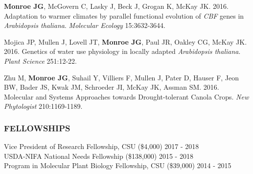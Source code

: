 \documentclass[12pt,english]{article}
\begin{document}
\begin{hangparas}{.5in}{1}
\vspace{1ex}\par
\hspace{1em} \textbf{Monroe JG}, McGovern C, Lasky J, Beck J, Grogan K, McKay JK. 2016. Adaptation to warmer climates by parallel functional evolution of \textit{CBF} genes in \textit{Arabidopsis thaliana}. \textit{Molecular Ecology} 15:3632-3644.
\vspace{1ex}\par
\hspace{1em} Mojica JP, Mullen J, Lovell JT, \textbf{Monroe JG}, Paul JR, Oakley CG, McKay JK. 2016. Genetics of water use physiology in locally adapted \textit{Arabidopsis thaliana}. \textit{Plant Science}  251:12-22.
\vspace{1ex}\par
\hspace{1em} Zhu M, \textbf{Monroe JG}, Suhail Y, Villiers F, Mullen J, Pater D, Hauser F, Jeon BW, Bader JS, Kwak JM, Schroeder JI, McKay JK, Assman SM. 2016. Molecular and Systems Approaches towards Drought-tolerant Canola Crops. \textit{New Phytologist} 210:1169-1189.
\end{hangparas}
\vspace{1ex}


\subsubsection*{FELLOWSHIPS}
\vspace{-0.5ex}
\hspace*{1.0em} Vice President of Research Fellowship, CSU (\$4,000)
\hfill
2017 - 2018
\vspace{1ex}\\
\hspace*{1.0em} USDA-NIFA National Needs Fellowship (\$138,000)
\hfill
2015 - 2018
\vspace{1ex}\\
\hspace*{1.0em} Program in Molecular Plant Biology Fellowship, CSU (\$39,000)
\hfill
2014 - 2015
\vspace{1ex}


\end{document}

